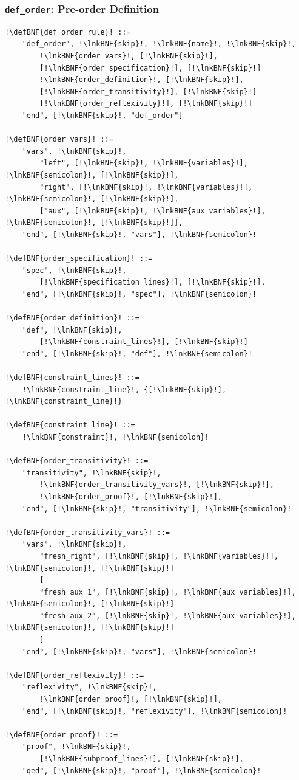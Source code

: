 \documentclass[a4paper]{article}
\newcommand{\defBNF}[1]{\hypertarget{def:#1}{<\detokenize{#1}>}}
\newcommand{\lnkBNF}[1]{\hyperlink{def:#1}{<\detokenize{#1}>}}
\begin{document}
\subsubsection{\texttt{def\_order}: Pre-order Definition}\label{sec:rules-def-order}
\begin{lstlisting}
!\defBNF{def_order_rule}! ::=
	"def_order", !\lnkBNF{skip}!, !\lnkBNF{name}!, !\lnkBNF{skip}!,
		!\lnkBNF{order_vars}!, [!\lnkBNF{skip}!],
		[!\lnkBNF{order_specification}!], [!\lnkBNF{skip}!]
		!\lnkBNF{order_definition}!, [!\lnkBNF{skip}!],
		[!\lnkBNF{order_transitivity}!], [!\lnkBNF{skip}!]
		[!\lnkBNF{order_reflexivity}!], [!\lnkBNF{skip}!]
	"end", [!\lnkBNF{skip}!, "def_order"]

!\defBNF{order_vars}! ::=
	"vars", !\lnkBNF{skip}!,
		"left", [!\lnkBNF{skip}!, !\lnkBNF{variables}!], !\lnkBNF{semicolon}!, [!\lnkBNF{skip}!],
		"right", [!\lnkBNF{skip}!, !\lnkBNF{variables}!], !\lnkBNF{semicolon}!, [!\lnkBNF{skip}!],
		["aux", [!\lnkBNF{skip}!, !\lnkBNF{aux_variables}!], !\lnkBNF{semicolon}!, [!\lnkBNF{skip}!]],
	"end", [!\lnkBNF{skip}!, "vars"], !\lnkBNF{semicolon}!

!\defBNF{order_specification}! ::=
	"spec", !\lnkBNF{skip}!,
		[!\lnkBNF{specification_lines}!], [!\lnkBNF{skip}!],
	"end", [!\lnkBNF{skip}!, "spec"], !\lnkBNF{semicolon}!

!\defBNF{order_definition}! ::=
	"def", !\lnkBNF{skip}!,
		[!\lnkBNF{constraint_lines}!], [!\lnkBNF{skip}!]
	"end", [!\lnkBNF{skip}!, "def"], !\lnkBNF{semicolon}!

!\defBNF{constraint_lines}! ::=
	!\lnkBNF{constraint_line}!, {[!\lnkBNF{skip}!], !\lnkBNF{constraint_line}!}

!\defBNF{constraint_line}! ::=
	!\lnkBNF{constraint}!, !\lnkBNF{semicolon}!

!\defBNF{order_transitivity}! ::=
	"transitivity", !\lnkBNF{skip}!,
		!\lnkBNF{order_transitivity_vars}!, [!\lnkBNF{skip}!],
		!\lnkBNF{order_proof}!, [!\lnkBNF{skip}!],
	"end", [!\lnkBNF{skip}!, "transitivity"], !\lnkBNF{semicolon}!

!\defBNF{order_transitivity_vars}! ::=
	"vars", !\lnkBNF{skip}!,
		"fresh_right", [!\lnkBNF{skip}!, !\lnkBNF{variables}!], !\lnkBNF{semicolon}!, [!\lnkBNF{skip}!]
		[
		"fresh_aux_1", [!\lnkBNF{skip}!, !\lnkBNF{aux_variables}!], !\lnkBNF{semicolon}!, [!\lnkBNF{skip}!]
		"fresh_aux_2", [!\lnkBNF{skip}!, !\lnkBNF{aux_variables}!], !\lnkBNF{semicolon}!, [!\lnkBNF{skip}!]
		]
	"end", [!\lnkBNF{skip}!, "vars"], !\lnkBNF{semicolon}!

!\defBNF{order_reflexivity}! ::=
	"reflexivity", !\lnkBNF{skip}!,
		!\lnkBNF{order_proof}!, [!\lnkBNF{skip}!],
	"end", [!\lnkBNF{skip}!, "reflexivity"], !\lnkBNF{semicolon}!

!\defBNF{order_proof}! ::=
	"proof", !\lnkBNF{skip}!,
		[!\lnkBNF{subproof_lines}!], [!\lnkBNF{skip}!],
	"qed", [!\lnkBNF{skip}!, "proof"], !\lnkBNF{semicolon}!
\end{lstlisting}
\end{document}
